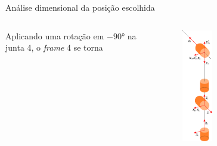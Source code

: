 \documentclass[aspectratio=169]{beamer}
\begin{document}
\begin{frame}{Análise dimensional da posição escolhida}
\begin{columns}
Aplicando uma rotação em $\ang{-90}$ na junta 4, o \textit{frame} 4 se torna

\begin{figure}
    \centering
    \includegraphics[width=0.3\textwidth,right]{Fig/val_a.eps}
\end{figure}


\end{columns}
\end{frame}
\end{document}
